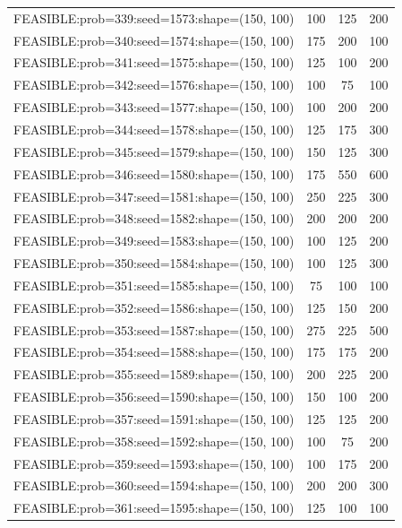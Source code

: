 \begin{longtable}{lccc}
FEASIBLE:prob=339:seed=1573:shape=(150, 100) &      100 &   125 &    200 \\
FEASIBLE:prob=340:seed=1574:shape=(150, 100) &      175 &   200 &    100 \\
FEASIBLE:prob=341:seed=1575:shape=(150, 100) &      125 &   100 &    200 \\
FEASIBLE:prob=342:seed=1576:shape=(150, 100) &      100 &    75 &    100 \\
FEASIBLE:prob=343:seed=1577:shape=(150, 100) &      100 &   200 &    200 \\
FEASIBLE:prob=344:seed=1578:shape=(150, 100) &      125 &   175 &    300 \\
FEASIBLE:prob=345:seed=1579:shape=(150, 100) &      150 &   125 &    300 \\
FEASIBLE:prob=346:seed=1580:shape=(150, 100) &      175 &   550 &    600 \\
FEASIBLE:prob=347:seed=1581:shape=(150, 100) &      250 &   225 &    300 \\
FEASIBLE:prob=348:seed=1582:shape=(150, 100) &      200 &   200 &    200 \\
FEASIBLE:prob=349:seed=1583:shape=(150, 100) &      100 &   125 &    200 \\
FEASIBLE:prob=350:seed=1584:shape=(150, 100) &      100 &   125 &    300 \\
FEASIBLE:prob=351:seed=1585:shape=(150, 100) &       75 &   100 &    100 \\
FEASIBLE:prob=352:seed=1586:shape=(150, 100) &      125 &   150 &    200 \\
FEASIBLE:prob=353:seed=1587:shape=(150, 100) &      275 &   225 &    500 \\
FEASIBLE:prob=354:seed=1588:shape=(150, 100) &      175 &   175 &    200 \\
FEASIBLE:prob=355:seed=1589:shape=(150, 100) &      200 &   225 &    200 \\
FEASIBLE:prob=356:seed=1590:shape=(150, 100) &      150 &   100 &    200 \\
FEASIBLE:prob=357:seed=1591:shape=(150, 100) &      125 &   125 &    200 \\
FEASIBLE:prob=358:seed=1592:shape=(150, 100) &      100 &    75 &    200 \\
FEASIBLE:prob=359:seed=1593:shape=(150, 100) &      100 &   175 &    200 \\
FEASIBLE:prob=360:seed=1594:shape=(150, 100) &      200 &   200 &    300 \\
FEASIBLE:prob=361:seed=1595:shape=(150, 100) &      125 &   100 &    100 \\

\end{longtable}
